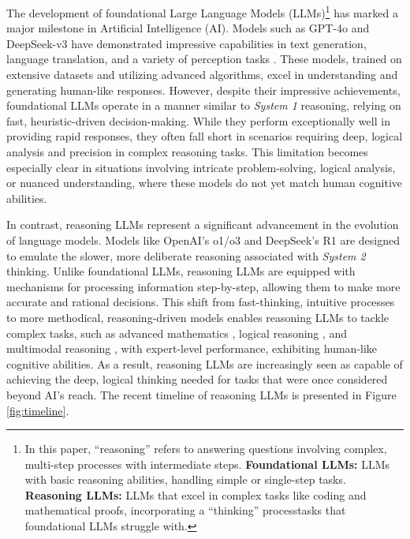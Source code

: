 The development of foundational Large Language Models (LLMs)\footnote{In this paper, ``reasoning'' refers to answering questions involving complex, multi-step processes with intermediate steps. \textbf{Foundational LLMs:} LLMs with basic reasoning abilities, handling simple or single-step tasks. \textbf{Reasoning LLMs:} LLMs that excel in complex tasks like coding and mathematical proofs, incorporating a ``thinking'' process\textendash tasks that foundational LLMs struggle with.} has marked a major milestone in Artificial Intelligence (AI). 
Models such as GPT-4o \cite{gpt4o-0513} and DeepSeek-v3 \cite{liu2024deepseek} have demonstrated impressive capabilities in text generation, language translation, and a variety of perception tasks \cite{vaswani2017attention, DBLP:conf/naacl/DevlinCLT19, DBLP:journals/corr/abs-1907-11692, radford2018improving, radford2019language, brown2020language, ouyang2022training, touvron2023llama, zhao2023survey, liu2023llava, DBLP:conf/acl/ZhangY0L0C024}. 
These models, trained on extensive datasets and utilizing advanced algorithms, excel in understanding and generating human-like responses. 
However, despite their impressive achievements, foundational LLMs operate in a manner similar to \textit{System 1} reasoning, relying on fast, heuristic-driven decision-making. 
While they perform exceptionally well in providing rapid responses, they often fall short in scenarios requiring deep, logical analysis and precision in complex reasoning tasks. 
This limitation becomes especially clear in situations involving intricate problem-solving, logical analysis, or nuanced understanding, where these models do not yet match human cognitive abilities.

In contrast, reasoning LLMs represent a significant advancement in the evolution of language models. 
Models like OpenAI's o1/o3 \cite{openai_o1, o3-mini} and DeepSeek's R1 \cite{Deepseek-R1} are designed to emulate the slower, more deliberate reasoning associated with \textit{System 2} thinking. 
Unlike foundational LLMs, reasoning LLMs are equipped with mechanisms for processing information step-by-step, allowing them to make more accurate and rational decisions. 
This shift from fast-thinking, intuitive processes to more methodical, reasoning-driven models enables reasoning LLMs to tackle complex tasks, such as advanced mathematics \cite{cobbe2021training, kojima2022large, liu2023improving, zhu2023solving, ludynamic, lightmanlet}, logical reasoning \cite{yao2023thinking, yao2023beyond, wen2023mindmap, lei2023boosting, jin2024impact, besta2024graph, cheng2024self}, and multimodal reasoning \cite{you2023idealgpt, wu2024v, chen2024genome}, with expert-level performance, exhibiting human-like cognitive abilities. 
As a result, reasoning LLMs are increasingly seen as capable of achieving the deep, logical thinking needed for tasks that were once considered beyond AI's reach. 
The recent timeline of reasoning LLMs is presented in Figure \ref{fig:timeline}.

